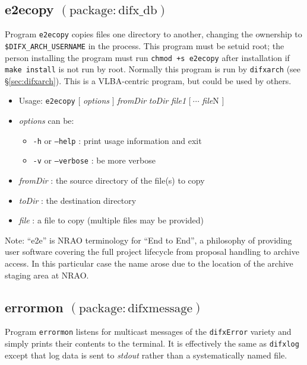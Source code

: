 \subsection{e2ecopy {\small $\mathrm{(package: difx\_db)}$}} \label{sec:e2ecopy}

Program {\tt e2ecopy} copies files one directory to another, changing the ownership to 
{\tt \$DIFX\_ARCH\_USERNAME} in the process.
This program must be setuid root; the person installing the program must run {\tt chmod +s e2ecopy} after installation if {\tt make install} is not run by root.
Normally this program is run by {\tt difxarch} (see \S\ref{sec:difxarch}).
This is a VLBA-centric program, but could be used by others.

\begin{itemize}
\item[] Usage: {\tt e2ecopy} $[$ {\em options} $]$ {\em fromDir} {\em toDir} {\em file1} $[\ \cdots$ {\em file}N $]$
\item[] {\em options} can be:
\begin{itemize}
\item[] {\tt -h} or {\tt --help} : print usage information and exit
\item[] {\tt -v} or {\tt --verbose} : be more verbose
\end{itemize}
\item[] {\em fromDir} : the source directory of the file(s) to copy
\item[] {\em toDir} : the destination directory
\item[] {\em file} : a file to copy (multiple files may be provided)
\end{itemize}

\noindent
Note: ``e2e'' is NRAO terminology for ``End to End'', a philosophy of providing user software covering the full project lifecycle from proposal handling to archive access.
In this particular case the name arose due to the location of the archive staging area at NRAO.






\subsection{errormon {\small $\mathrm{(package: difxmessage)}$}} \label{sec:errormon} 

Program {\tt errormon} listens for multicast messages of the {\tt difxError} variety and simply prints their contents to the terminal.
It is effectively the same as {\tt difxlog} except that log data is sent to {\em stdout} rather than a systematically named file.

